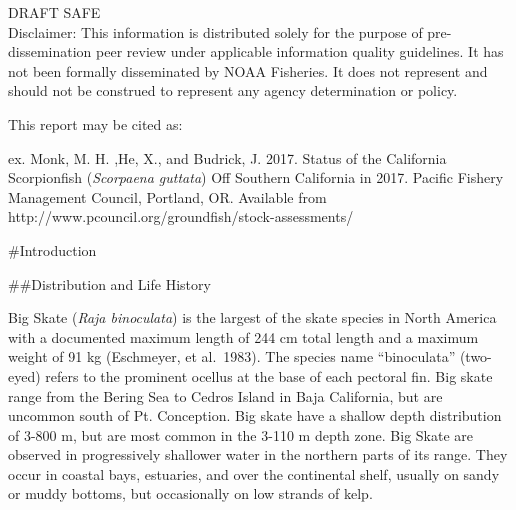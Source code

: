 \documentclass[12pt,]{article}
\begin{document}
\begin{center}
\vspace{.5cm}

\vfill
DRAFT SAFE\\
Disclaimer: This information is distributed solely for the purpose of pre-dissemination
peer review under applicable information quality guidelines. It has not been formally
disseminated by NOAA Fisheries. It does not represent and should not be construed to
represent any agency determination or policy. 

\vspace{.3cm}


\newpage{\thispagestyle{empty}}


\begin{flushleft}
This report may be cited as:

ex. Monk, M. H. ,He, X., and Budrick, J. 2017. Status of the California Scorpionfish (\emph{Scorpaena guttata}) Off Southern California in 2017. Pacific Fishery Management Council, Portland, OR. Available from http://www.pcouncil.org/groundfish/stock-assessments/
\end{flushleft}

\maketitle

\setcounter{page}{1}
\end{center}

{
\setcounter{tocdepth}{4}
\tableofcontents
}
\setlength{\parskip}{5mm plus1mm minus1mm}
\pagebreak

\setcounter{page}{1}
\renewcommand{\thefigure}{\alph{figure}}
\renewcommand{\thetable}{\alph{table}}

\#Introduction

\#\#Distribution and Life History

Big Skate (\emph{Raja binoculata}) is the largest of the skate species
in North America with a documented maximum length of 244 cm total length
and a maximum weight of 91 kg (Eschmeyer, et al.~1983). The species name
``binoculata'' (two-eyed) refers to the prominent ocellus at the base of
each pectoral fin. Big skate range from the Bering Sea to Cedros Island
in Baja California, but are uncommon south of Pt. Conception. Big skate
have a shallow depth distribution of 3-800 m, but are most common in the
3-110 m depth zone. Big Skate are observed in progressively shallower
water in the northern parts of its range. They occur in coastal bays,
estuaries, and over the continental shelf, usually on sandy or muddy
bottoms, but occasionally on low strands of kelp.
\end{document}

